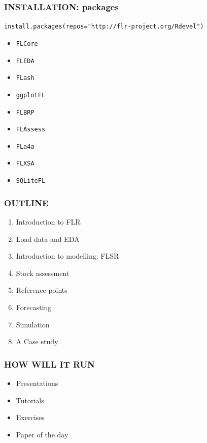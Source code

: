 \documentclass[ignorenonframetext,]{beamer}
\begin{document}
\begin{frame}[fragile]\frametitle{INSTALLATION: packages}

\texttt{install.packages(repos="http://flr-project.org/Rdevel")}

\begin{itemize}
\item
  \texttt{FLCore}
\item
  \texttt{FLEDA}
\item
  \texttt{FLash}
\item
  \texttt{ggplotFL}
\item
  \texttt{FLBRP}
\item
  \texttt{FLAssess}
\item
  \texttt{FLa4a}
\item
  \texttt{FLXSA}
\item
  \texttt{SQLiteFL}
\end{itemize}
\end{frame}

\begin{frame}\frametitle{OUTLINE}

\begin{enumerate}[1.]
\item
  Introduction to FLR
\item
  Load data and EDA
\item
  Introduction to modelling: FLSR
\item
  Stock assessment
\item
  Reference points
\item
  Forecasting
\item
  Simulation
\item
  A Case study
\end{enumerate}
\end{frame}

\begin{frame}\frametitle{HOW WILL IT RUN}

\begin{itemize}
\item
  Presentations
\item
  Tutorials
\item
  Exercises
\item
  Paper of the day
\end{itemize}
\end{frame}
\end{document}

